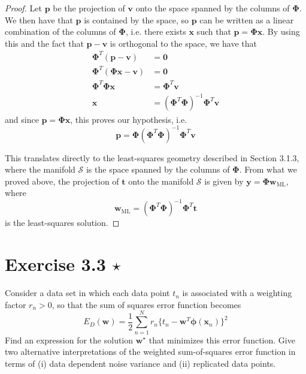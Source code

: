\begin{proof}
    Let $\mathbf{p}$ be the projection of $\mathbf{v}$ onto the space spanned by the
    columns of $\mathbf{\Phi}$. We then have that $\mathbf{p}$ is contained by
    the space, so $\mathbf{p}$ can be written as a linear combination
    of the columns of $\mathbf{\Phi}$, i.e. there exists $\mathbf{x}$
    such that  $\mathbf{p} = \mathbf{\Phi}\mathbf{x}$. By using this
    and the fact that $\mathbf{p} - \mathbf{v}$ is orthogonal
    to the space, we have that
    \begin{align*}
        \mathbf{\Phi}^T(\mathbf{p} - \mathbf{v}) &= \mathbf{0} \\
        \mathbf{\Phi}^T(\mathbf{\Phi}\mathbf{x} - \mathbf{v}) &= \mathbf{0} \\
        \mathbf{\Phi}^T\mathbf{\Phi}\mathbf{x} &= \mathbf{\Phi}^T\mathbf{v} \\
        \mathbf{x} &= (\mathbf{\Phi}^T\mathbf{\Phi})^{-1}\mathbf{\Phi}^T\mathbf{v}
    \end{align*}
    and since $\mathbf{p} = \mathbf{\Phi}\mathbf{x}$, this proves our hypothesis,
    i.e. 
    \[
        \mathbf{p} = \mathbf{\Phi}(\mathbf{\Phi}^T\mathbf{\Phi})^{-1}\mathbf{\Phi}^T\mathbf{v}
    \] 

    This translates directly to the least-squares geometry described 
    in Section 3.1.3, where the manifold $\mathcal{S}$ is the space spanned
    by the columns of $\mathbf{\Phi}$. From what we proved above,
    the projection of $\mathbf{t}$ onto the manifold $\mathcal{S}$ 
    is given by $\mathbf{y} = \mathbf{\Phi}\mathbf{w}_{\text{ML}}$,
    where 
    \begin{equation}\label{eq:3.15}\tag{3.15}
        \mathbf{w}_{\text{ML}} = (\mathbf{\Phi}^T \mathbf{\Phi})^{-1} \mathbf{\Phi}^T \mathbf{t}
    \end{equation}
    is the least-squares solution.
\end{proof}

\section*{Exercise 3.3 $\star$}
Consider a data set in which each data point $t_n$ is associated with a weighting
factor $r_n > 0$, so that the sum of squares error function becomes
\begin{equation}\label{eq:3.104}\tag{3.104}
    E_D(\mathbf{w}) = \frac{1}{2} \sum_{n=1}^{N} 
    r_n\{t_n - \mathbf{w}^T \bm{\phi}(\mathbf{x}_n)\}^2
\end{equation}
Find an expression for the solution $\mathbf{w}^\star$ that minimizes this error function.
Give two alternative interpretations of the weighted sum-of-squares error function
in terms of (i) data dependent noise variance and (ii) replicated data points.

